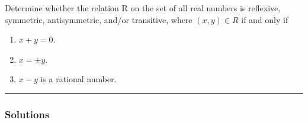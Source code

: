 \begin{question}
Determine whether the relation R on the set of all real
numbers is reflexive, symmetric, antisymmetric, and/or
transitive, where $(x, y) \in R$ if and only if
\begin{enumerate}
    \item $x + y = 0$.
    \item $x = \pm y$.
    \item $x-y$ is a rational number.
\end{enumerate}
\end{question}

\par\noindent\rule{\textwidth}{0.5pt}

\subsubsection*{Solutions}

